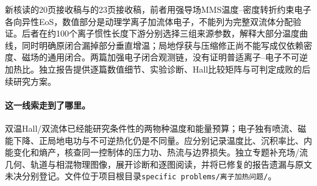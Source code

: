 新核读\citet{Wetherton2019}的20页接收稿与\citet{Wetherton2021}的23页接收稿，前者用强导场MMS温度--密度转折约束电子各向异性EoS，数值部分是动理学离子加流体电子，不能列为完整双流体分配验证。后者在约100个离子惯性长度下游分别选择三组来源参数，解释大部分温度曲线，同时明确原闭合漏掉部分垂直增温；局地俘获与压缩修正尚不能写成仅依赖密度、磁场的通用闭合。两篇加强电子闭合观测链，没有证明普适离子--电子不可逆加热比。独立报告提供逐篇数值细节、实验诊断、Hall比较矩阵与可判定成败的后续研究方案。

\paragraph{这一线索走到了哪里。}双温Hall/双流体已经能研究条件性的两物种温度和能量预算；电子独有喷流、磁能下降、正局地电功与不可逆热化仍是不同量。应分别记录温度比、沉积率比、内能变化和熵产，核查同一控制体的压力功、热流与边界损失。独立专题补充场/流几何、轨道与相混物理图像，展开诊断和逐图阅读，并将已修复的报告遗漏与原文未决分别登记。文件位于项目根目录\texttt{specific problems/离子加热问题/}。
